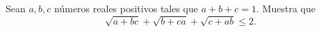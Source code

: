 Sean $a,b,c$ números reales positivos tales que $a+b+c=1$. Muestra que 
\[\sqrt{a+bc}+\sqrt{b+ca}+\sqrt{c+ab}\leq 2.\]